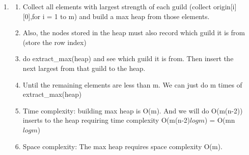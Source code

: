 \documentclass{article}
\begin{document}
\begin{CJK*}{UTF8}{bsmi}
\begin{enumerate}
    \item 
        \begin{enumerate}
            \item Collect all elements with largest strength of each guild (collect origin[i][0],for i = 1 to m) and build a max heap from those elements.
            \item Also, the nodes stored in the heap must also record which guild it is from (store the row index)
            \item do extract\_max(heap) and see which guild it is from. Then insert the next largest from that guild to the heap.
            \item Until the remaining elements are less than m. We can just do m times of extract\_max(heap)
            \item Time complexity: building max heap is O(m). And we will do O(m(n-2)) inserts to the heap requiring time complexity O(m(n-2)$log{m}$) = O(mn$log{m}$)
            \item Space complexity: The max heap requires space complexity O(m).
        \end{enumerate}
\end{enumerate}

\end{CJK*}
\end{document}
